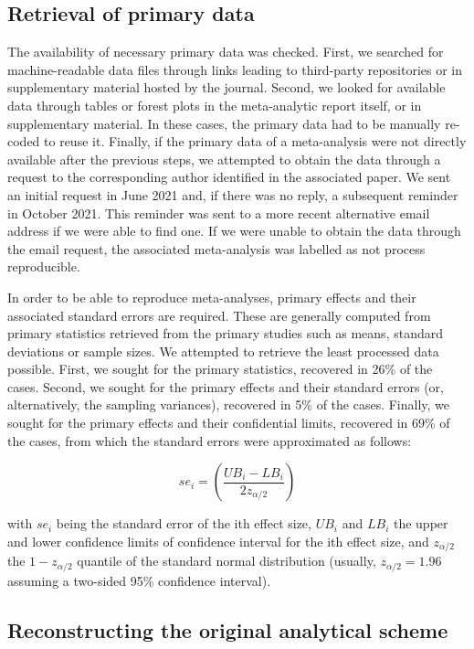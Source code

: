 \documentclass[
  ,apa7,floatsintext]{apa6}
\begin{document}
\hypertarget{retrieval-of-primary-data}{%
\subsection{Retrieval of primary data}\label{retrieval-of-primary-data}}

The availability of necessary primary data was checked. First, we searched for machine-readable data files through links leading to third-party repositories or in supplementary material hosted by the journal. Second, we looked for available data through tables or forest plots in the meta-analytic report itself, or in supplementary material. In these cases, the primary data had to be manually re-coded to reuse it. Finally, if the primary data of a meta-analysis were not directly available after the previous steps, we attempted to obtain the data through a request to the corresponding author identified in the associated paper. We sent an initial request in June 2021 and, if there was no reply, a subsequent reminder in October 2021. This reminder was sent to a more recent alternative email address if we were able to find one. If we were unable to obtain the data through the email request, the associated meta-analysis was labelled as not process reproducible.

In order to be able to reproduce meta-analyses, primary effects and their associated standard errors are required. These are generally computed from primary statistics retrieved from the primary studies such as means, standard deviations or sample sizes. We attempted to retrieve the least processed data possible. First, we sought for the primary statistics, recovered in 26\% of the cases. Second, we sought for the primary effects and their standard errors (or, alternatively, the sampling variances), recovered in 5\% of the cases. Finally, we sought for the primary effects and their confidential limits, recovered in 69\% of the cases, from which the standard errors were approximated as follows:

\[se_i = (\frac{UB_i - LB_i}{2z_{\alpha/2}})\]

with \(se_i\) being the standard error of the ith effect size, \(UB_i\) and \(LB_i\) the upper and lower confidence limits of confidence interval for the ith effect size, and \(z_{\alpha/2}\) the \(1 - z_{\alpha/2}\) quantile of the standard normal distribution (usually, \(z_{\alpha/2} = 1.96\) assuming a two-sided 95\% confidence interval).

\hypertarget{reconstructing-the-original-analytical-scheme}{%
\subsection{Reconstructing the original analytical scheme}\label{reconstructing-the-original-analytical-scheme}}
\end{document}
